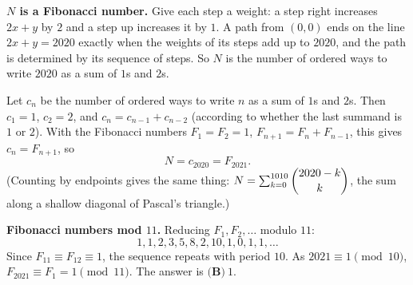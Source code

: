 \textbf{$N$ is a Fibonacci number.} Give each step a weight: a step right increases $2x+y$ by $2$ and a step up increases it by $1$. A path from $(0,0)$ ends on the line $2x+y=2020$ exactly when the weights of its steps add up to $2020$, and the path is determined by its sequence of steps. So $N$ is the number of ordered ways to write $2020$ as a sum of $1$s and $2$s.

Let $c_n$ be the number of ordered ways to write $n$ as a sum of $1$s and $2$s. Then $c_1=1$, $c_2=2$, and $c_n=c_{n-1}+c_{n-2}$ (according to whether the last summand is $1$ or $2$). With the Fibonacci numbers $F_1=F_2=1$, $F_{n+1}=F_n+F_{n-1}$, this gives $c_n=F_{n+1}$, so
\[N=c_{2020}=F_{2021}.\]
(Counting by endpoints gives the same thing: $N=\sum_{k=0}^{1010}\dbinom{2020-k}{k}$, the sum along a shallow diagonal of Pascal's triangle.)

\textbf{Fibonacci numbers mod $11$.} Reducing $F_1,F_2,\ldots$ modulo $11$:
\[1,1,2,3,5,8,2,10,1,0,1,1,\ldots\]
Since $F_{11}\equiv F_{12}\equiv1$, the sequence repeats with period $10$. As $2021\equiv1\pmod{10}$, $F_{2021}\equiv F_1=1\pmod{11}$. The answer is $\boxed{\textbf{(B)}\ 1}$.
